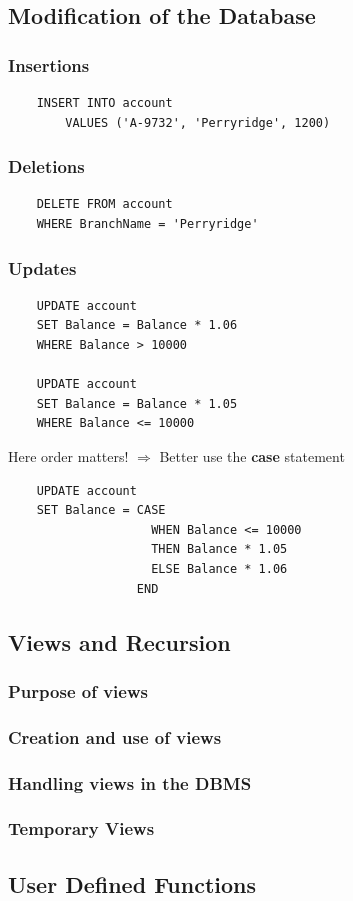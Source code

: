 \subsection{Modification of the Database}

\subsubsection{Insertions}
\begin{lstlisting}
    INSERT INTO account
        VALUES ('A-9732', 'Perryridge', 1200)
\end{lstlisting}

\subsubsection{Deletions}
\begin{lstlisting}
    DELETE FROM account
    WHERE BranchName = 'Perryridge'
\end{lstlisting}
\subsubsection{Updates}
\begin{lstlisting}
    UPDATE account
    SET Balance = Balance * 1.06
    WHERE Balance > 10000

    UPDATE account 
    SET Balance = Balance * 1.05
    WHERE Balance <= 10000
\end{lstlisting}
Here order matters! $\Rightarrow$ Better use the \textbf{case} statement 
\begin{lstlisting}
    UPDATE account
    SET Balance = CASE 
                    WHEN Balance <= 10000
                    THEN Balance * 1.05
                    ELSE Balance * 1.06
                  END
\end{lstlisting}   

\subsection{Views and Recursion}

\subsubsection{Purpose of views}

\subsubsection{Creation and use of views}

\subsubsection{Handling views in the DBMS}

\subsubsection{Temporary Views}


\subsection{User Defined Functions}